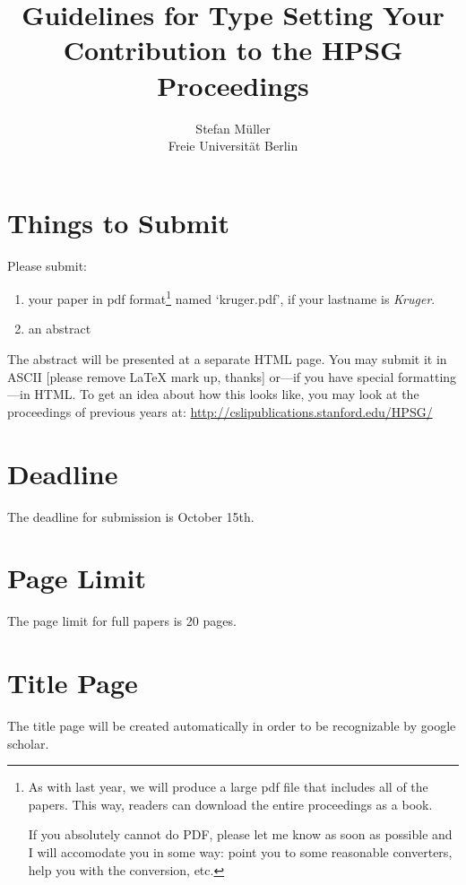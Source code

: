 \documentclass[11pt,a4paper,fleqn]{article}
\title{Guidelines for Type Setting Your Contribution to the HPSG Proceedings}
\author{Stefan Müller\\
Freie Universität Berlin}
\begin{document}
\maketitle


\section{Things to Submit}

Please submit:
\begin{enumerate}
\item your paper in pdf format\footnote{
As with last year, we will produce a large pdf file that includes all
of the papers.  This way, readers can download the entire proceedings
as a book.

If you absolutely cannot do PDF, please let me know as soon as
possible and I will accomodate you in some way: point you to some
reasonable converters, help you with the conversion, etc.}
%
 named `kruger.pdf', if your lastname is \emph{Kruger}.



\item an abstract
\end{enumerate}
The abstract will be presented at a separate HTML page. You may submit it in ASCII [please remove \LaTeX{} mark up, thanks]
or---if you have special formatting---in HTML. 
To get an idea about how this looks like,
you may look at the proceedings of previous years at:\newline
\url{http://cslipublications.stanford.edu/HPSG/}\section{Deadline}

The deadline for submission is October 15th.

\section{Page Limit}

The page limit for full papers is 20 pages.


\section{Title Page}


The title page will be created automatically in order to be recognizable by google scholar.
\end{document}

